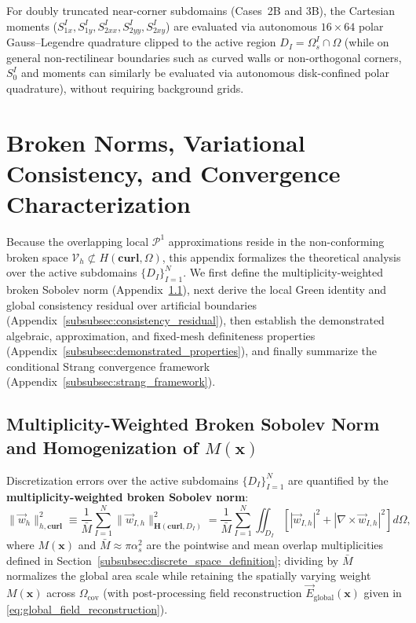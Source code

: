 \documentclass[VANCOUVER,Times1COL]{WileyNJD-v5}
\begin{document}
For doubly truncated near-corner subdomains (Cases~2B and 3B), the Cartesian moments ($S_{1x}^I, S_{1y}^I, S_{2xx}^I, S_{2yy}^I, S_{2xy}^I$) are evaluated via autonomous $16 \times 64$ polar Gauss--Legendre quadrature clipped to the active region $D_I = \Omega_s^I \cap \Omega$ (while on general non-rectilinear boundaries such as curved walls or non-orthogonal corners, $S_0^I$ and moments can similarly be evaluated via autonomous disk-confined polar quadrature), without requiring background grids.

\section{Broken Norms, Variational Consistency, and Convergence Characterization}
\label{subsec:variational_consistency_strang}

Because the overlapping local $\mathcal{P}^1$ approximations reside in the non-conforming broken space $\mathcal{V}_h \not\subset H(\mathbf{curl}, \Omega)$, this appendix formalizes the theoretical analysis over the active subdomains $\{D_I\}_{I=1}^N$. We first define the multiplicity-weighted broken Sobolev norm (Appendix~\ref{subsec:conformity_discussion}), next derive the local Green identity and global consistency residual over artificial boundaries (Appendix~\ref{subsubsec:consistency_residual}), then establish the demonstrated algebraic, approximation, and fixed-mesh definiteness properties (Appendix~\ref{subsubsec:demonstrated_properties}), and finally summarize the conditional Strang convergence framework (Appendix~\ref{subsubsec:strang_framework}).

\subsection{Multiplicity-Weighted Broken Sobolev Norm and Homogenization of $M(\mathbf{x})$}
\label{subsec:conformity_discussion}

Discretization errors over the active subdomains $\{D_I\}_{I=1}^N$ are quantified by the \textbf{multiplicity-weighted broken Sobolev norm}:
\begin{equation}
    \|\vec{w}_h\|_{h, \mathbf{curl}}^2 \equiv \frac{1}{\bar{M}} \sum_{I=1}^N \|\vec{w}_{I,h}\|_{\boldsymbol{H}(\mathbf{curl}, D_I)}^2 = \frac{1}{\bar{M}} \sum_{I=1}^N \iint_{D_I} \left[ |\vec{w}_{I,h}|^2 + |\nabla \times \vec{w}_{I,h}|^2 \right] d\Omega,
    \label{eq:rigorous_broken_norm}
\end{equation}
where $M(\mathbf{x})$ and $\bar{M} \approx \pi \alpha_s^2$ are the pointwise and mean overlap multiplicities defined in Section~\ref{subsubsec:discrete_space_definition}; dividing by $\bar{M}$ normalizes the global area scale while retaining the spatially varying weight $M(\mathbf{x})$ across $\Omega_{\mathrm{cov}}$ (with post-processing field reconstruction $\vec{E}_{\mathrm{global}}(\mathbf{x})$ given in \eqref{eq:global_field_reconstruction}).
\end{document}
